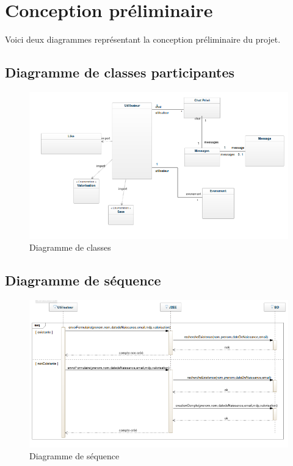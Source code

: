 \chapter{Conception préliminaire}
Voici deux diagrammes représentant la conception préliminaire du projet. 
\section{Diagramme de classes participantes}
\vfill
\begin{figure}[ht!]
  \centering
   \caption{Diagramme de classes}
   \includegraphics[scale=0.5]{ddc1}
\end{figure}
\vfill
\newpage

\section{Diagramme de séquence}
\vfill
\begin{figure}[ht!]
  \centering
   \caption{Diagramme de séquence}
   \includegraphics[scale=0.6]{dscc}
\end{figure}
\vfill
\newpage
